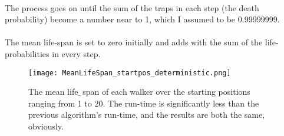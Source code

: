 \documentclass[12pt]{article}
\begin{document}
\paragraph*{} The process goes on until the sum of the traps in each step (the death probability) become a number near to 1, which I assumed to be 0.99999999. 
\paragraph*{} The mean life-span is set to zero initially and adds with the sum of the life-probabilities in every step. 
\begin{figure}[H]
	\centering
	\texttt{[image: MeanLifeSpan\_startpos\_deterministic.png]}
	\label{fig:mesh2}
	\caption{The mean life$\_\ $span of each walker over the starting positions ranging from 1 to 20. The run-time is significantly less than the previous algorithm's run-time, and the results are both the same, obviously.}
\end{figure}
\end{document}
